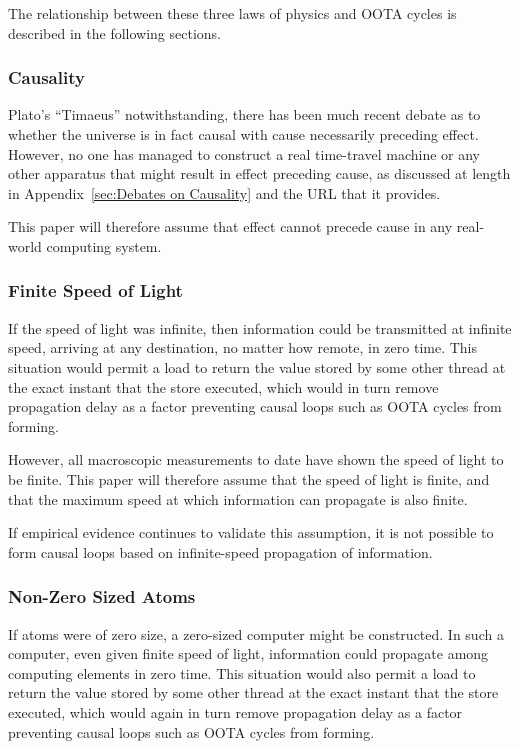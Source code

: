 \documentclass[10]{article}
\begin{document}
The relationship between these three laws of physics and OOTA
cycles is described in the following sections.

\subsubsection{Causality}
\label{sec:Causality}

Plato's ``Timaeus'' notwithstanding, there has been much recent debate
as to whether the universe is in fact causal with cause necessarily
preceding effect.
However, no one has managed to construct a real time-travel machine
or any other apparatus that might result in effect preceding cause,
as discussed at length in Appendix~\ref{sec:Debates on Causality} and 
the URL that it provides.

This paper will therefore assume that effect cannot precede cause in
any real-world computing system.

\subsubsection{Finite Speed of Light}
\label{sec:Finite Speed of Light}

If the speed of light was infinite, then information could be transmitted
at infinite speed, arriving at any destination, no matter how remote,
in zero time.
This situation would permit a load to return the value stored by some
other thread at the exact instant that the store executed, which
would in turn remove propagation delay as a factor preventing
causal loops such as OOTA cycles from forming.

However, all macroscopic measurements to date have shown the speed of
light to be finite.
This paper will therefore assume that the speed of light is finite, and
that the maximum speed at which information can propagate is also finite.

If empirical evidence continues to validate this assumption, it is
not possible to form causal loops based on infinite-speed propagation
of information.

\subsubsection{Non-Zero Sized Atoms}
\label{sec:Non-Zero Sized Atoms}

If atoms were of zero size, a zero-sized computer might be constructed.
In such a computer, even given finite speed of light, information could
propagate among computing elements in zero time.
This situation would also permit a load to return the value stored by
some other thread at the exact instant that the store executed, which
would again in turn remove propagation delay as a factor preventing
causal loops such as OOTA cycles from forming.
\end{document}
